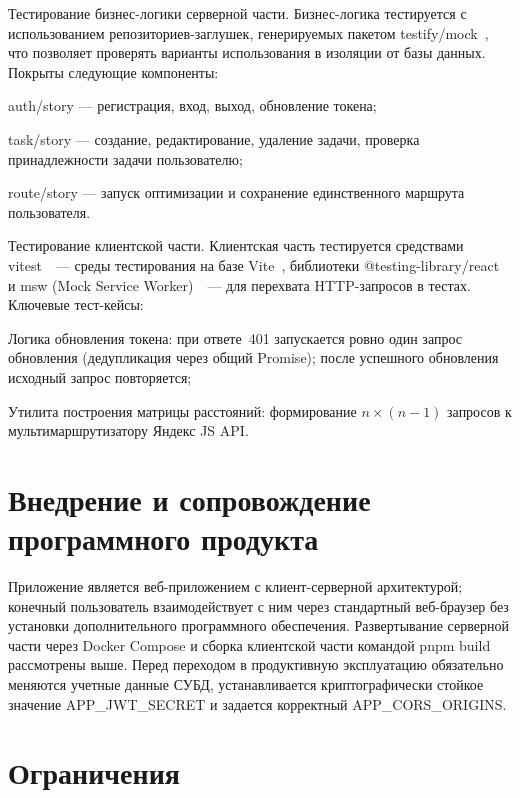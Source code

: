 Тестирование бизнес-логики серверной части. Бизнес-логика тестируется с использованием репозиториев-заглушек,
генерируемых пакетом testify/mock~\cite{testify}, что позволяет
проверять варианты использования в изоляции от базы данных. Покрыты следующие
компоненты:
\begin{compactlist}
  \item auth/story --- регистрация, вход, выход, обновление токена;
  \item task/story --- создание, редактирование, удаление задачи,
        проверка принадлежности задачи пользователю;
  \item route/story --- запуск оптимизации и сохранение
        единственного маршрута пользователя.
\end{compactlist}

Тестирование клиентской части. Клиентская часть тестируется средствами vitest~\cite{vitest}~---
среды тестирования на базе Vite~\cite{vite}, библиотеки
@testing-library/react~\cite{react_testing_library} и
msw (Mock Service Worker)~\cite{msw}~--- для перехвата HTTP-запросов
в тестах. Ключевые тест-кейсы:

\begin{compactlist}
  \item Логика обновления токена: при ответе~401 запускается ровно один
        запрос обновления (дедупликация через общий Promise); после
        успешного обновления исходный запрос повторяется;
  \item Утилита построения матрицы расстояний: формирование
        $n \times (n-1)$ запросов к мультимаршрутизатору Яндекс JS API.
\end{compactlist}

\section{Внедрение и сопровождение программного продукта}

Приложение является веб-приложением с клиент-серверной архитектурой;
конечный пользователь взаимодействует с ним через стандартный веб-браузер
без установки дополнительного программного обеспечения. Развертывание
серверной части через Docker Compose и сборка клиентской части командой
pnpm build рассмотрены выше. Перед переходом в продуктивную
эксплуатацию обязательно меняются учетные данные СУБД, устанавливается
криптографически стойкое значение APP\_JWT\_SECRET и задается
корректный APP\_CORS\_ORIGINS.

\section{Ограничения}

